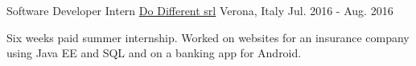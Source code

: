 \begin{cventries}
  \cventry
    {Software Developer Intern}
    {\href{http://www.dodifferent.it/}{Do Different srl}}
    {Verona, Italy}
    {Jul. 2016 - Aug. 2016}
    {
      \begin{cvitems}
        \item {Six weeks paid summer internship. Worked on websites for an insurance company using Java EE and SQL and on a banking app for Android.}
      \end{cvitems}
    }



\end{cventries}
